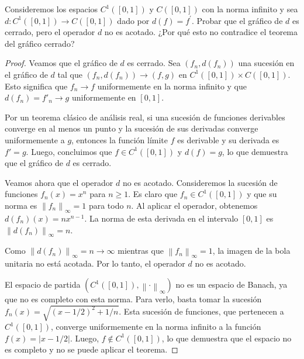 \documentclass{article}
\theoremstyle{definition}
\newcommand{\norm}[1]{\left\lVert #1 \right\rVert}       %
\newenvironment{ejercicio}[1]{\begin{trivlist}
\item[\hskip \labelsep {\bfseries Ejercicio}\hskip \labelsep {\bfseries #1.}]}{\end{trivlist}}
\begin{document}
\vspace{0.5cm}

\begin{ejercicio}{11}
    Consideremos los espacios \(C^{1}([0,1])\) y \(C([0,1])\) con la norma infinito y sea \(d: C^{1}([0,1])\to C([0,1])\) dado por \(d(f)=f^{\prime}\). Probar que el gráfico de \(d\) es cerrado, pero el operador \(d\) no es acotado. ¿Por qué esto no contradice el teorema del gráfico cerrado?
\end{ejercicio}
\begin{proof}
    Veamos que el gráfico de \(d\) es cerrado. Sea \((f_n, d(f_n))\) una sucesión en el gráfico de \(d\) tal que \((f_n, d(f_n)) \to (f, g)\) en \(C^1([0,1]) \times C([0,1])\). Esto significa que \(f_n \to f\) uniformemente en la norma infinito y que \(d(f_n) = f'_n \to g\) uniformemente en \([0,1]\).

    Por un teorema clásico de análisis real, si una sucesión de funciones derivables converge en al menos un punto y la sucesión de sus derivadas converge uniformemente a \(g\), entonces la función límite \(f\) es derivable y su derivada es \(f' = g\). Luego, concluimos que \(f \in C^1([0,1])\) y \(d(f) = g\), lo que demuestra que el gráfico de \(d\) es cerrado.

    Veamos ahora que el operador \(d\) no es acotado. Consideremos la sucesión de funciones \(f_n(x) = x^n\) para \(n \ge 1\). Es claro que \(f_n \in C^1([0,1])\) y que su norma es \(\norm{f_n}_\infty = 1\) para todo \(n\). Al aplicar el operador, obtenemos \(d(f_n)(x) = n x^{n-1}\). La norma de esta derivada en el intervalo \([0,1]\) es \(\norm{d(f_n)}_\infty = n\).

    Como \( \norm{d(f_n)}_\infty = n \to \infty \) mientras que \(\norm{f_n}_\infty = 1\), la imagen de la bola unitaria no está acotada. Por lo tanto, el operador \(d\) no es acotado.

    El espacio de partida \((C^1([0,1]), \norm{\cdot}_\infty)\) no es un espacio de Banach, ya que no es completo con esta norma. Para verlo, basta tomar la sucesión \(f_n(x) = \sqrt{{(x - 1/2)}^2 + 1/n}\). Esta sucesión de funciones, que pertenecen a \(C^1([0,1])\), converge uniformemente en la norma infinito a la función \(f(x) = |x - 1/2|\). Luego, \(f \notin C^1([0,1])\), lo que demuestra que el espacio no es completo y no se puede aplicar el teorema.
\end{proof}

\vspace{0.5cm}
\end{document}

